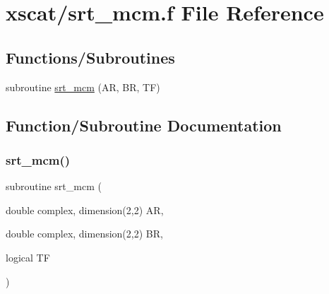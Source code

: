 \hypertarget{xscat_2srt__mcm_8f}{}\section{xscat/srt\+\_\+mcm.f File Reference}
\label{xscat_2srt__mcm_8f}
\subsection*{Functions/\+Subroutines}
\begin{DoxyCompactItemize}
\item 
subroutine \hyperlink{xscat_2srt__mcm_8f_a5ce07d8afa81bd629b6c20eb0ee405d9}{srt\+\_\+mcm} (AR, BR, TF)
\end{DoxyCompactItemize}


\subsection{Function/\+Subroutine Documentation}
\mbox{\label{xscat_2srt__mcm_8f_a5ce07d8afa81bd629b6c20eb0ee405d9}} 
\subsubsection{\texorpdfstring{srt\+\_\+mcm()}{srt\_mcm()}}
{\footnotesize\ttfamily subroutine srt\+\_\+mcm (\begin{DoxyParamCaption}\item[{double complex, dimension(2,2)}]{AR,  }\item[{double complex, dimension(2,2)}]{BR,  }\item[{logical}]{TF }\end{DoxyParamCaption})}

